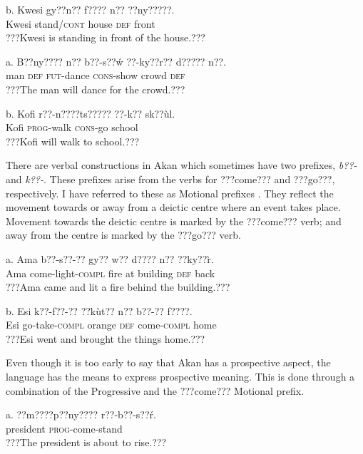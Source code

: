 \documentclass[output=paper]{langsci/langscibook}
\begin{document}
\ea
\gll b.  Kwesi  gy??n??    f????  n??  ??ny?????.\\
       Kwesi  stand/\textsc{cont}  house  \textsc{def}  front\\
\glt ???Kwesi is standing in front of the house.???
\z

\ea
\gll a.  B??ny????  n??  b??-s??\'{w}   ??-ky??r??    d?????  n??.\\
       man  \textsc{def}  \textsc{fut}{}-dance  \textsc{cons}{}-show  crowd  \textsc{def}\\
\glt   ???The man will dance for the crowd.???
\z

\ea
\gll   b.  Kofi  r??-n????ts?????  ??-k??    sk??\`{u}l.\\
       Kofi  \textsc{prog}{}-walk  \textsc{cons}{}-go  school\\
\glt   ???Kofi will walk to school.???
\z

There are verbal constructions in Akan which sometimes have two prefixes, \emph{b??-} and \emph{k??-}. These prefixes arise from the verbs for ???come??? and ???go???, respectively. I have referred to these as Motional prefixes \citep{Osam2002}. They reflect the movement towards or away from a deictic centre where an event takes place. Movement towards the deictic centre is marked by the ???come??? verb; and away from the centre is marked by the ???go??? verb. 

\ea
\gll a.  Ama  b??-s??-??      gy??  w??  d????    n??  ??ky??\`{r}.\\
       Ama  come-light-\textsc{compl}  fire  at  building  \textsc{def}  back\\
\glt   ???Ama came and lit a fire behind the building.???
\z

\ea
\gll  b.  Esi  k??-f??-??      ??k\`{u}t??    n??  b??-??    f????.\\
       Esi  go-take-\textsc{compl}  orange    \textsc{def}  come-\textsc{compl}  home\\
\glt   ???Esi went and brought the things home.???
\z

Even though it is too early to say that Akan has a prospective aspect, the language has the means to express prospective meaning. This is done through a combination of the Progressive and the ???come??? Motional prefix.

\ea
\gll a.  ??m????p??ny????  r??-b??-s??\'{r}.\\
       president  \textsc{prog}{}-come-stand\\
\glt   ???The president is about to rise.???
\z
\end{document}
